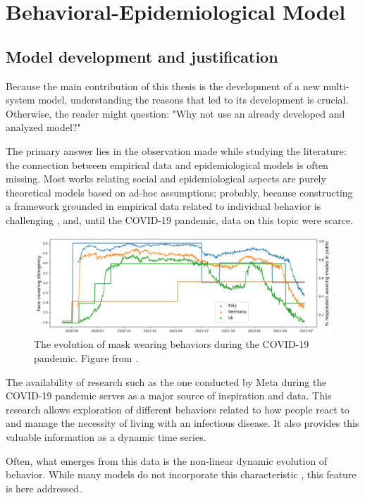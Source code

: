 \part{Behavioral-Epidemiological Model}
\label{part:the_model}
\chapter{Model development and justification}
\label{ch:why_new}
Because the main contribution of this thesis is the development of a new multi-system model, understanding the reasons that led to its development is crucial.
Otherwise, the reader might question: "Why not use an already developed and analyzed model?"

The primary answer lies in the observation made while studying the literature: the connection between empirical data and epidemiological models is often missing. Most works relating social and epidemiological aspects are purely theoretical models based on ad-hoc assumptions; probably, because constructing a framework grounded in empirical data related to individual behavior is challenging \cite{Nunner2021}, and, until the COVID-19 pandemic, data on this topic were scarce.

\begin{figure}[ht]
	\centering
	\includegraphics[width=0.8\linewidth]{1_corpo/figure/Fig2cut}
	\caption[Mask wearing evolution]{The evolution of mask wearing behaviors during the COVID-19 pandemic. Figure from \cite{Proverbio_Tex_2024}.}
	\label{fig:mask_wearing}
\end{figure}

The availability of research such as the one conducted by Meta during the COVID-19 pandemic \cite{Astley_2021} serves as a major source of inspiration and data. This research allows exploration of different behaviors related to how people react to and manage the necessity of living with an infectious disease. It also provides this valuable information as a dynamic time series.

Often, what emerges from this data is the non-linear dynamic evolution of behavior. While many models do not incorporate this characteristic \cite{huys2010nonlinear}, this feature is here addressed.



